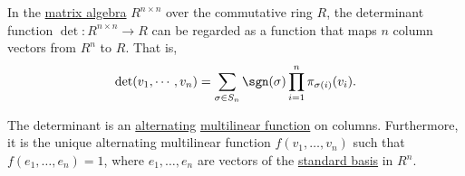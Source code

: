 \begin{proposition}\label{thm:determinant_on_columns}
  In the \hyperref[thm:matrix_algebra]{matrix algebra} \( R^{n \times n} \) over the commutative ring \( R \), the determinant function \( \det: R^{n \times n} \to R \) can be regarded as a function that maps \( n \) column vectors from \( R^n \) to \( R \). That is,
  \begin{equation}\label{eq:thm:determinant_on_columns}
    \det(v_1, \cdots, v_n) = \sum_{\sigma \in S_n} \sgn(\sigma) \prod_{i=1}^n \pi_{\sigma(i)} (v_i).
  \end{equation}

  The determinant is an \hyperref[def:alternating_function]{alternating} \hyperref[def:multilinear_function]{multilinear function} on columns. Furthermore, it is the unique alternating multilinear function \( f(v_1, \ldots, v_n) \) such that \( f(e_1, \ldots, e_n) = 1 \), where \( e_1, \ldots, e_n \) are vectors of the \hyperref[def:coordinate_space]{standard basis} in \( R^n \).
\end{proposition}
